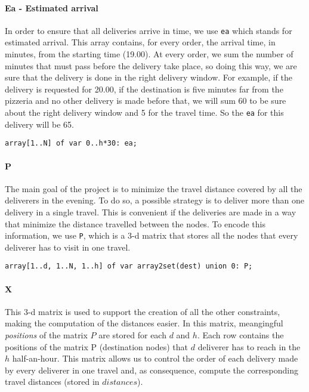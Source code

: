 \documentclass[10pt]{article}
\begin{document}
	\paragraph*{Ea - Estimated arrival}
	In order to ensure that all deliveries arrive in time, we use \texttt{ea} which
	stands for estimated arrival. This array contains, for every order, the arrival 
	time, in minutes, from the starting time (19.00). At every order, we sum the number 
	of minutes that must pass before the delivery take place, so doing this way,
	we are sure that the delivery is done in the right delivery window.
	For example, if the delivery is requested for 20.00, if the destination is five minutes 
	far from the pizzeria and no other delivery is made before that, we will sum 60 to 
	be sure about the right delivery window and 5 for the travel time. So the \texttt{ea}
	for this delivery will be 65.
	
	\begin{center}
		\texttt{array[1..N] of var 0..h*30: ea;}
	\end{center}
	

	\paragraph*{P} The main goal of the project is to minimize the travel distance 
	covered by all the deliverers in the evening. To do so, a possible strategy
	is to deliver more than one delivery in a single travel. This is convenient 
	if the deliveries are made in a way that minimize the distance travelled between the nodes.
	To encode this information, we use \texttt{P}, which is a 3-d matrix that stores
	all the nodes that every deliverer has to visit in one travel. 

	\begin{center}
		\texttt{array[1..d, 1..N, 1..h] of var array2set(dest) union {0}: P;}
	\end{center}
	
	\paragraph*{X} This 3-d matrix is used to support the creation of all the other 
	constraints, making the computation of the distances easier.
	In this matrix, meangingful \textit{positions} of the matrix $P$ are stored for each 
	$d$ and $h$. Each row contains the positions of the matrix P (destination nodes) 
	that $d$ deliverer has to reach in the $h$ half-an-hour. This matrix allows 
	us to control the order of each delivery made by every deliverer in one travel
	and, as consequence, compute the corresponding travel distances (stored in $distances$).
\end{document}
